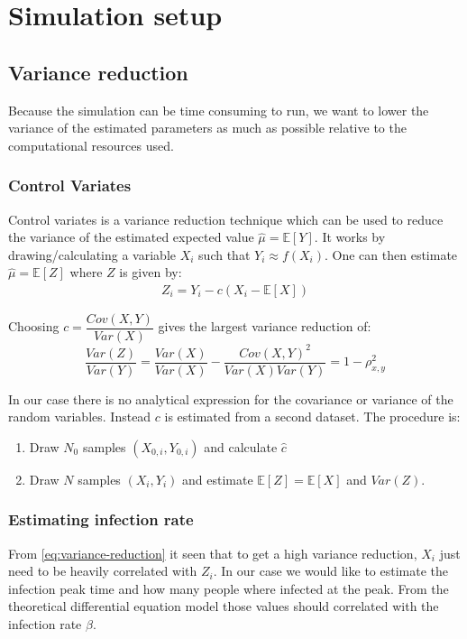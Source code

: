 \section{Simulation setup}
\subsection{Variance reduction}
Because the simulation can be time consuming to run, we want to lower the variance of the estimated parameters as much as possible relative to the computational resources used.

\subsubsection{Control Variates}
Control variates is a variance reduction technique which can be used to reduce the variance of the estimated expected value $\hat{\mu} = \mathbb{E}[Y]$. It works by drawing/calculating a variable $X_i$ such that $Y_i \approx f(X_i)$. One can then estimate $\hat{\mu} = \mathbb{E}[Z]$ where $Z$ is given by:
\begin{align}
Z_i = Y_i - c (X_i - \mathbb{E}[X])
\end{align}

Choosing $c = \dfrac{Cov(X, Y)}{Var(X)}$ gives the largest variance reduction of:
\begin{equation}
\frac{Var(Z)}{Var(Y)} = \frac{Var(X)}{Var(X)} - \frac{Cov(X, Y)^2}{Var(X) Var(Y)} = 1 - \rho_{x, y}^2 \label{eq:variance-reduction}
\end{equation}

In our case there is no analytical expression for the covariance or variance of the random variables. Instead $c$ is estimated from a second dataset. The procedure is:
\begin{enumerate}
	\item Draw $N_0$ samples $(X_{0,i}, Y_{0, i})$ and calculate $\hat{c}$
	\item Draw $N$ samples $(X_i, Y_i)$ and estimate $\mathbb{E}[Z] = \mathbb{E}[X]$ and $Var(Z)$.
\end{enumerate}

\subsubsection{Estimating infection rate}

From \eqref{eq:variance-reduction} it seen that to get a high variance reduction, $X_i$ just need to be heavily correlated with $Z_i$. In our case we would like to estimate the infection peak time and how many people where infected at the peak. From the theoretical differential equation model those values should correlated with the infection rate $\beta$.

